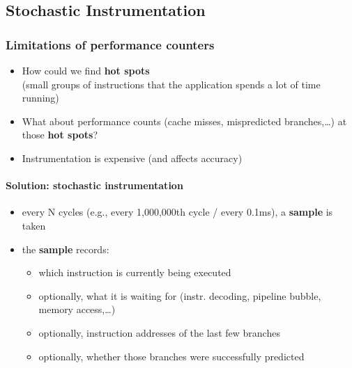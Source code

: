 \documentclass[12pt]{article}
\begin{document}
\subsection{Stochastic Instrumentation}

\subsubsection{Limitations of performance counters}

\begin{itemize}
    \item How could we find \textbf{hot spots}\\
    (small groups of instructions that the application spends a lot of time running)
    
    \item What about performance counts (cache misses, mispredicted branches,\ldots)
    at those \textbf{hot spots}?
    
    \item Instrumentation is expensive (and affects accuracy)
\end{itemize}

\paragraph{Solution: stochastic instrumentation}

\begin{itemize}
    \item every N cycles (e.g., every 1,000,000th cycle / every 0.1ms), a \textbf{sample} is taken
    \item the \textbf{sample} records:
    \begin{itemize}
        \item which instruction is currently being executed
        \item optionally, what it is waiting for (instr. decoding, pipeline bubble, memory access,\ldots)
        \item optionally, instruction addresses of the last few branches
        \item optionally, whether those branches were successfully predicted
    \end{itemize}
\end{itemize}
\end{document}
